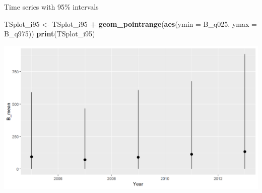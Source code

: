 \documentclass[
  ignorenonframetext,
]{beamer}
\newenvironment{Shaded}{\begin{snugshade}}{\end{snugshade}}
\newcommand{\DataTypeTok}[1]{\textcolor[rgb]{0.13,0.29,0.53}{#1}}
\newcommand{\KeywordTok}[1]{\textcolor[rgb]{0.13,0.29,0.53}{\textbf{#1}}}
\newcommand{\NormalTok}[1]{#1}
\newcommand{\OperatorTok}[1]{\textcolor[rgb]{0.81,0.36,0.00}{\textbf{#1}}}
\newcommand{\StringTok}[1]{\textcolor[rgb]{0.31,0.60,0.02}{#1}}
\begin{document}
\begin{frame}[fragile]{Time series with 95\% intervals}
\protect\hypertarget{time-series-with-95-intervals-1}{}

\begin{Shaded}
\begin{Highlighting}[]
\NormalTok{TSplot_i95 <-}\StringTok{ }\NormalTok{TSplot_i95 }\OperatorTok{+}
\StringTok{  }\KeywordTok{geom_pointrange}\NormalTok{(}\KeywordTok{aes}\NormalTok{(}\DataTypeTok{ymin =}\NormalTok{ B_q025, }\DataTypeTok{ymax =}\NormalTok{ B_q975))}
\KeywordTok{print}\NormalTok{(TSplot_i95)}
\end{Highlighting}
\end{Shaded}

\begin{center}\includegraphics[width=0.8\linewidth]{figure/sp_TSplot_i95b-1} \end{center}

\end{frame}
\end{document}
